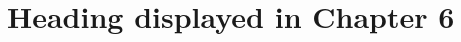\chapter[\leavevmode\newline Heading of Chapter 6 to show in TOC]{Heading displayed in  Chapter 6}
\label{chap:Chapter_6}
\lipsum[6]